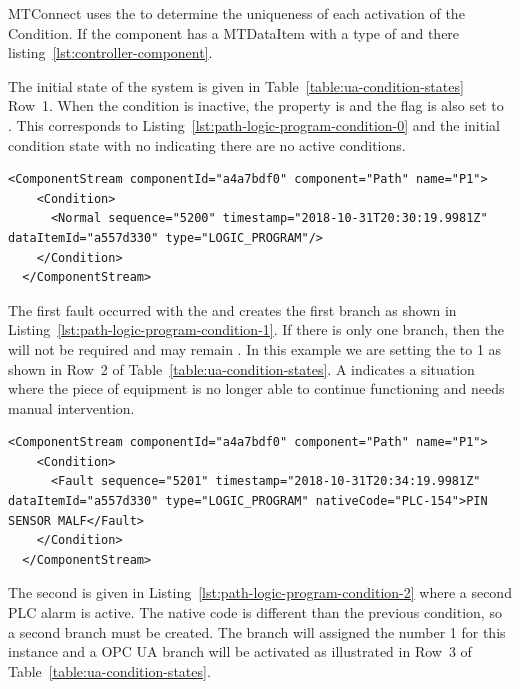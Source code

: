MTConnect uses the  to determine the uniqueness of each activation of the Condition. If the  component has a \gls{MTDataItem} with a \gls{type} of  and there listing~\ref{lst:controller-component}.

The initial state of the system is given in Table~\ref{table:ua-condition-states} Row~1. When the condition is inactive, the  property is  and the  flag is also set to . This corresponds to Listing~\ref{lst:path-logic-program-condition-0} and the  initial condition state with no  indicating there are no active conditions.

\begin{lstlisting}[firstnumber=last,escapechar=|,%
    caption={Path Logic Program Initial Normal State},label={lst:path-logic-program-condition-0}]
  <ComponentStream componentId="a4a7bdf0" component="Path" name="P1">
    <Condition>
      <Normal sequence="5200" timestamp="2018-10-31T20:30:19.9981Z" dataItemId="a557d330" type="LOGIC_PROGRAM"/>
    </Condition>
  </ComponentStream>
\end{lstlisting}

The first fault occurred with the   and creates the first branch as shown in Listing~\ref{lst:path-logic-program-condition-1}. If there is only one branch, then the  will not be required and may remain . In this example we are setting the  to 1 as shown in Row~2 of Table~\ref{table:ua-condition-states}. A  indicates a situation where the piece of equipment is no longer able to continue functioning and needs manual intervention.

\begin{lstlisting}[firstnumber=last,escapechar=|,%
    caption={Path Logic Program First Fault PLC-154},label={lst:path-logic-program-condition-1}]
  <ComponentStream componentId="a4a7bdf0" component="Path" name="P1">
    <Condition>
      <Fault sequence="5201" timestamp="2018-10-31T20:34:19.9981Z" dataItemId="a557d330" type="LOGIC_PROGRAM" nativeCode="PLC-154">PIN SENSOR MALF</Fault>
    </Condition>
  </ComponentStream>
\end{lstlisting}

The second  is given in Listing~\ref{lst:path-logic-program-condition-2} where a second PLC alarm is active. The native code is different than the previous condition, so a second branch must be created. The branch will assigned the number 1 for this instance and a OPC UA branch will be activated as illustrated in Row~3 of Table~\ref{table:ua-condition-states}. 

